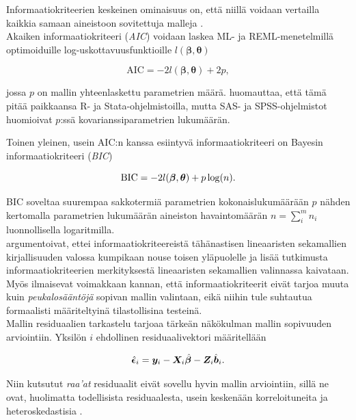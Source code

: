 \documentclass[finnish]{docopts}
\begin{document}
 Informaatiokriteerien keskeinen ominaisuus on, että niillä voidaan vertailla kaikkia samaan aineistoon sovitettuja malleja \cite{west14}.\\
 
 Akaiken informaatiokriteeri (\textit{AIC}) voidaan laskea ML- ja REML-menetelmillä optimoiduille log-uskottavuusfunktioille \cite{west14} $l(\bm{\beta}, \bm{\theta})$
 
 $$
 \text{AIC} = -2l(\bm{\beta}, \bm{\theta})+2p,
 $$
 
 jossa $p$ on mallin yhteenlaskettu parametrien määrä. \cite{west14} huomauttaa, että tämä pitää paikkaansa R- ja Stata-ohjelmistoilla, mutta SAS- ja SPSS-ohjelmistot huomioivat $p$:ssä kovarianssiparametrien lukumäärän.
 
 Toinen yleinen, usein AIC:n kanssa esiintyvä informaatiokriteeri on Bayesin informaatiokriteeri (\textit{BIC})
 
 $$
 \text{BIC} = -2l(\bm{\beta}, \bm{\theta})+p\log(n).\\
 $$
 
 BIC soveltaa suurempaa sakkotermiä parametrien kokonaislukumäärään $p$ nähden kertomalla parametrien lukumäärän aineiston havaintomäärän $n = \sum\limits_{i}^m n_i$ luonnollisella logaritmilla.\\
 
 \cite{west14} argumentoivat, ettei informaatiokriteereistä tähänastisen lineaaristen sekamallien kirjallisuuden valossa kumpikaan nouse toisen yläpuolelle ja lisää tutkimusta informaatiokriteerien merkityksestä lineaaristen sekamallien valinnassa kaivataan.\\
 
 Myös \cite{verbeke00} ilmaisevat voimakkaan kannan, että informaatiokriteerit eivät tarjoa muuta kuin \textit{peukalosääntöjä} sopivan mallin valintaan, eikä niihin tule suhtautua formaalisti määriteltyinä tilastollisina testeinä. \\
 
 Mallin residuaalien tarkastelu tarjoaa tärkeän näkökulman mallin sopivuuden arviointiin. Yksilön $i$ ehdollinen residuaalivektori määritellään
 
 $$
\hat{\bm{\epsilon}}_i = \bm{y}_i - \bm{X}_i \hat{\bm{\beta}} - \bm{Z}_i \hat{\bm{b}}_i. \\
 $$
 
 
 Niin kutsutut \textit{raa'at} residuaalit eivät sovellu hyvin mallin arviointiin, sillä ne ovat, huolimatta todellisista residuaalesta, usein keskenään korreloituneita ja heteroskedastisia \cite{west14}.\\
 
\end{document}
